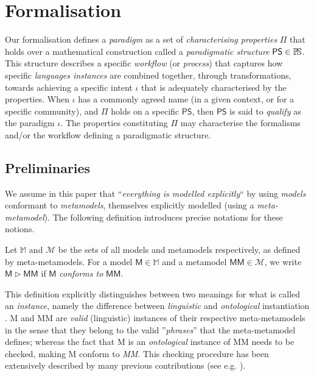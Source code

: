 \section{Formalisation}
\label{sec:Formalisation}

Our formalisation defines a \emph{paradigm} as a set of 
\emph{characterising properties} $\mathsf{\Pi}$ that holds over a mathematical 
construction called a \emph{paradigmatic structure} $\mathsf{PS}\in \mathbb{P}\!\mathbb{S}$. 
This structure describes a specific \emph{workflow} (or \emph{process}) that 
captures how specific \emph{languages instances} are combined together, 
through transformations, towards achieving a specific intent $\iota$ that is 
adequately characterised by the properties. When $\iota$ has a commonly agreed 
name (in a given context, or for a specific community), and $\mathsf{\Pi}$ holds 
on a specific $\mathsf{PS}$, then $\mathsf{PS}$ is said to \emph{qualify} as 
the paradigm $\iota$. The properties constituting $\mathsf{\Pi}$ may 
characterise the formalisms and/or the workflow defining a paradigmatic 
structure. 

\subsection{Preliminaries}
\label{sec:Formalisation-Preliminaries}

We assume in this paper that ``\emph{everything is modelled explicitly}`` by 
using \emph{models} conformant to \emph{metamodels}, themselves explicitly 
modelled (using a \emph{meta-metamodel}). The following definition introduces 
precise notations for these notions.

\begin{Definition}
   Let $\mathbb{M}$ and $\mathcal{M}$ be the sets of all models and metamodels 
respectively, as defined by meta-metamodels. For a model $\mathsf{M} \in 
\mathbb{M}$ and a metamodel $\mathsf{MM} \in \mathcal{M}$, we write $\mathsf{M} 
\rhd \mathsf{MM}$ if $\mathsf{M}$ \emph{conforms to} $\mathsf{MM}$.
\end{Definition}
This definition explicitly distinguishes between two meanings for what is 
called an \emph{instance}, namely the difference between \emph{linguistic} and 
\emph{ontological} instantiation \cite{J:Kuhne:2006}. \textsf{M} and \textsf{MM} 
are \emph{valid} (linguistic) instances of their respective meta-metamodels in 
the sense that they belong to the valid ''\emph{phrases}'' that the 
meta-metamodel defines; whereas the fact that \textsf{M} is an 
\emph{ontological} instance of \textsf{MM} needs to be checked, making 
\textsf{M} conform to \emph{MM}. This checking procedure has been extensively 
described by many previous contributions (see e.g. 
\cite{PhD:Amrani:2013,J:Rivera-Duran-Vallecillo:2009}).

